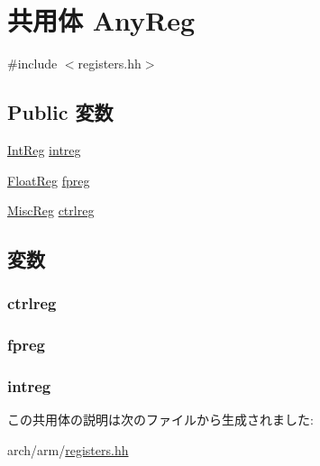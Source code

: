 \hypertarget{unionArmISA_1_1AnyReg}{
\section{共用体 AnyReg}
\label{unionArmISA_1_1AnyReg}
}


{\ttfamily \#include $<$registers.hh$>$}\subsection*{Public 変数}
\begin{DoxyCompactItemize}
\item 
\hyperlink{namespaceArmISA_a0e080577527fb3e9685399f75b5caf15}{IntReg} \hyperlink{unionArmISA_1_1AnyReg_a95ddd97e75712a86f53c43636e713a94}{intreg}
\item 
\hyperlink{namespaceArmISA_a449d6bb660f5ca613cf359f05d81a20f}{FloatReg} \hyperlink{unionArmISA_1_1AnyReg_a9154b30def3ee5315e8660e1a491c681}{fpreg}
\item 
\hyperlink{namespaceArmISA_aa16539aa6584fd12f7d6fa868f75b4de}{MiscReg} \hyperlink{unionArmISA_1_1AnyReg_ae69c08de24012a3af86f0f33249f321d}{ctrlreg}
\end{DoxyCompactItemize}


\subsection{変数}
\hypertarget{unionArmISA_1_1AnyReg_ae69c08de24012a3af86f0f33249f321d}{
\subsubsection[{ctrlreg}]{ {\bf ctrlreg}}}
\label{unionArmISA_1_1AnyReg_ae69c08de24012a3af86f0f33249f321d}
\hypertarget{unionArmISA_1_1AnyReg_a9154b30def3ee5315e8660e1a491c681}{
\subsubsection[{fpreg}]{ {\bf fpreg}}}
\label{unionArmISA_1_1AnyReg_a9154b30def3ee5315e8660e1a491c681}
\hypertarget{unionArmISA_1_1AnyReg_a95ddd97e75712a86f53c43636e713a94}{
\subsubsection[{intreg}]{ {\bf intreg}}}
\label{unionArmISA_1_1AnyReg_a95ddd97e75712a86f53c43636e713a94}


この共用体の説明は次のファイルから生成されました:\begin{DoxyCompactItemize}
\item 
arch/arm/\hyperlink{arm_2registers_8hh}{registers.hh}\end{DoxyCompactItemize}
